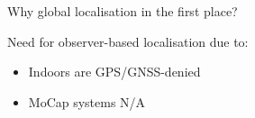 \begin{frame}[noframenumbering]{Why global localisation in the first place?}

  Need for observer-based localisation due to:

  \begin{itemize}
    \item Indoors are GPS/GNSS-denied
    \item MoCap systems N/A
  \end{itemize}

\end{frame}
